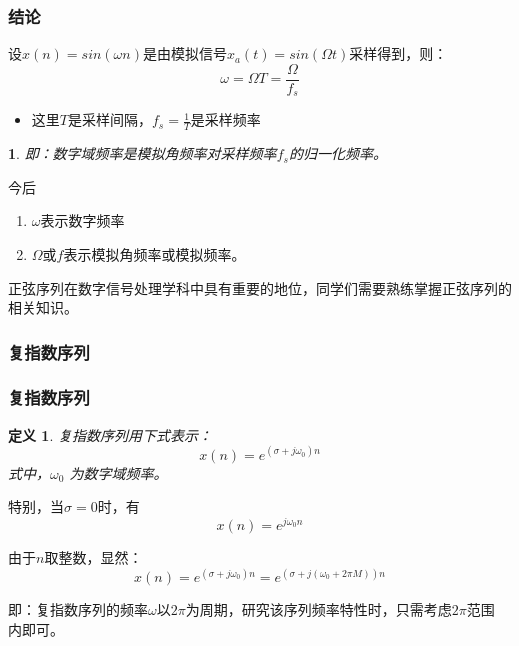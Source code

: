 \documentclass[notheorems,compress,mathserif,table]{beamer}
\newtheorem{definition}{定义}
\newtheorem{dablock}{}
\begin{document}
\begin{frame}[shrink]\frametitle{结论}%
设$x(n)=sin(\omega n)$是由模拟信号$x_{a}(t)= sin(\Omega t)$采样得到，则：
$$    \omega = \Omega T = \frac{\Omega}{f_{s}}$$
\begin{itemize}
  \item 这里$T$是采样间隔，$f_{s} =\frac{1}{T}$是采样频率
\end{itemize}
\begin{dablock}
即：数字域频率是模拟角频率对采样频率$f_{s}$的归一化频率。
\end{dablock}
今后
\begin{enumerate}
  \item [(1)] $\omega$表示数字频率
  \item [(2)] $\Omega$或$f$表示模拟角频率或模拟频率。
\end{enumerate}

正弦序列在数字信号处理学科中具有重要的地位，同学们需要熟练掌握正弦序列的相关知识。
\end{frame}

\subsubsection*{复指数序列}
\begin{frame}[shrink]\frametitle{复指数序列}%
\begin{definition}
复指数序列用下式表示：
$$ x(n) = e^{(\sigma + j\omega_{0})n}$$
式中，$\omega_0$ 为数字域频率。
\end{definition}

特别，当$\sigma =0$时，有$$x(n)=e^{j\omega_{0}n}$$

由于$n$取整数，显然：
$$x(n) = e^{(\sigma+j\omega_{0})n} = e^{(\sigma +j(\omega_{0}+2\pi M))n}$$

即：复指数序列的频率$\omega$以$2\pi$为周期，研究该序列频率特性时，只需考虑$2\pi$范围
内即可。

\end{frame}
\end{document}
